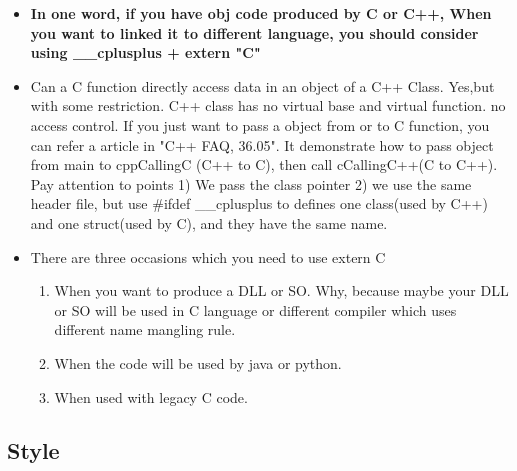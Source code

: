 \documentclass[a4paper,12pt,twoside]{book}
\begin{document}
\begin{itemize}
    \item \textbf{In one word, if you have obj code produced by C or C++, When you want to linked it to different language, you should consider using \_\_cplusplus + extern "C" }
    
    \item Can a C function directly access data in an object of a C++ Class. Yes,but with some restriction. C++ class has no virtual base and virtual function. no access control. If you just want to pass a object from or to C function, you can refer a article in "C++ FAQ, 36.05". It demonstrate how to pass object from main to cppCallingC (C++ to C), then call cCallingC++(C to C++). Pay attention to points 1) We pass the class pointer 2) we use the same header file, but use \#ifdef \_\_cplusplus to defines one class(used by C++) and one struct(used by C), and they have the same name.
    
    \item There are three occasions which you need to use extern C
    \begin{enumerate}
        \item When you want to produce a DLL or SO. Why, because maybe your DLL or SO will be used in C language or different compiler which uses different name mangling rule.
        
        \item When the code will be used by java or python.
        
        \item When used with legacy C code.
    \end{enumerate}
    
\end{itemize}

\subsection{Style}
\end{document}
